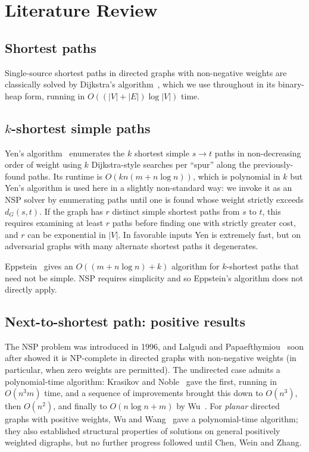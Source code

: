 \chapter{Literature Review}
\label{ch:litreview}

\section{Shortest paths}

Single-source shortest paths in directed graphs with non-negative weights are
classically solved by Dijkstra's algorithm~\cite{Dijkstra1959}, which we use
throughout in its binary-heap form, running in $O((|V|+|E|)\log|V|)$ time.

\section{$k$-shortest simple paths}

Yen's algorithm~\cite{Yen1971} enumerates the $k$ shortest simple $s\to t$
paths in non-decreasing order of weight using $k$ Dijkstra-style searches per
``spur'' along the previously-found paths. Its runtime is
$O(kn(m+n\log n))$, which is polynomial in $k$ but Yen's algorithm is used
here in a slightly non-standard way: we invoke it as an NSP solver by
enumerating paths until one is found whose weight strictly exceeds
$d_G(s,t)$. If the graph has $r$ distinct simple shortest paths from $s$ to
$t$, this requires examining at least $r$ paths before finding one with
strictly greater cost, and $r$ can be exponential in $|V|$. In favorable
inputs Yen is extremely fast, but on adversarial graphs with many alternate
shortest paths it degenerates.

Eppstein~\cite{Eppstein1998} gives an $O((m + n\log n) + k)$ algorithm for
$k$-shortest paths that need not be simple. NSP requires simplicity and so
Eppstein's algorithm does not directly apply.

\section{Next-to-shortest path: positive results}

The NSP problem was introduced in 1996, and Lalgudi and
Papaefthymiou~\cite{LalgudiPapaefthymiou1997} soon after showed it is
NP-complete in directed graphs with non-negative weights (in
particular, when zero weights are permitted). The undirected case admits a
polynomial-time algorithm: Krasikov and Noble~\cite{KrasikovNoble2004}
gave the first, running in $O(n^3 m)$ time, and a sequence of improvements
brought this down to $O(n^3)$, then $O(n^2)$, and finally to
$O(n\log n + m)$ by Wu~\cite{Wu2010}. For \emph{planar} directed graphs
with positive weights, Wu and Wang~\cite{WuWang2015} gave a
polynomial-time algorithm; they also established structural properties of
solutions on general positively weighted digraphs, but no further progress
followed until Chen, Wein and Zhang.

